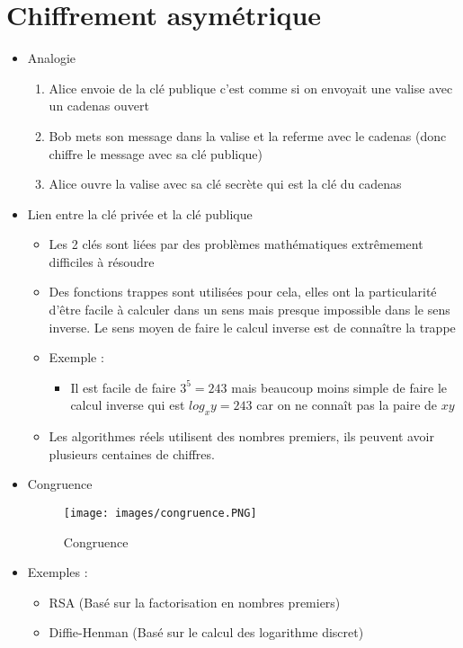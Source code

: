 \documentclass[a4paper]{article}
\begin{document}
\section{Chiffrement asymétrique}
\begin{itemize}[label=\textbullet, font=\Large]
    \item Analogie
    \begin{enumerate}
        \item Alice envoie de la clé publique c'est comme si on envoyait une valise avec un cadenas ouvert
        \item Bob mets son message dans la valise et la referme avec le cadenas (donc chiffre le message avec sa clé publique)
        \item Alice ouvre la valise avec sa clé secrète qui est la clé du cadenas
    \end{enumerate}
    \item Lien entre la clé privée et la clé publique
    \begin{itemize}[label=, font=\scriptsize]
        \item Les 2 clés sont liées par des problèmes mathématiques extrêmement difficiles à résoudre
        \item Des fonctions trappes sont utilisées pour cela, elles ont la particularité d'être facile à calculer dans un sens mais presque impossible dans le sens inverse. 
        Le sens moyen de faire le calcul inverse est de connaître la trappe
        \item Exemple : 
        \begin{itemize}
            \item Il est facile de faire $3^5 = 243$ mais beaucoup moins simple de faire le calcul inverse qui est $log_x y = 243$ car on ne connaît pas la paire de $x y$
        \end{itemize}
        \item Les algorithmes réels utilisent des nombres premiers, ils peuvent avoir plusieurs centaines de chiffres.        
    \end{itemize}
    \item Congruence
    \begin{figure}[H]
        \centering
        \texttt{[image: images/congruence.PNG]}
        \caption{Congruence}
    \end{figure}
    \item Exemples :
    \begin{itemize}[label=, font=\scriptsize]
        \item RSA (Basé sur la factorisation en nombres premiers)
        \item Diffie-Henman (Basé sur le calcul des logarithme discret)
    \end{itemize}
\end{itemize}
\end{document}
